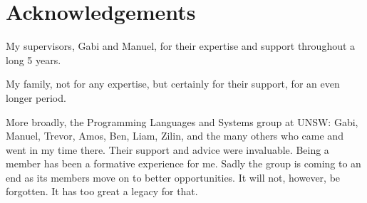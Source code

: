 \chapter{Acknowledgements}

\begin{center}
My supervisors, Gabi and Manuel, for their expertise and support throughout a long 5 years.

\qquad

My family, not for any expertise, but certainly for their support, for an even longer period.

\qquad

More broadly, the Programming Languages and Systems group at UNSW: Gabi, Manuel, Trevor, Amos, Ben, Liam, Zilin, and the many others who came and went in my time there. Their support and advice were invaluable. Being a member has been a formative experience for me. Sadly the group is coming to an end as its members move on to better opportunities. It will not, however, be forgotten. It has too great a legacy for that.

\end{center}
